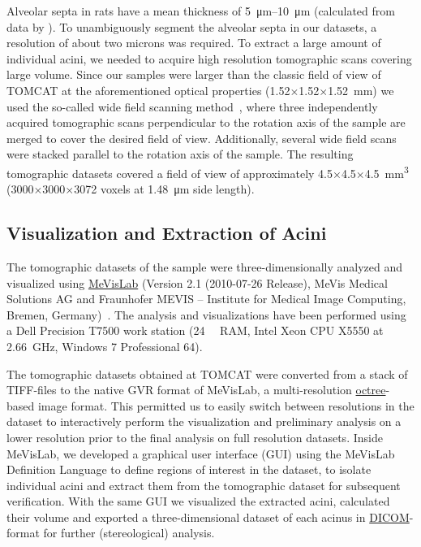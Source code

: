 \documentclass[a4paper,DIV=calc,abstract,english]{scrartcl}
\begin{document}
Alveolar septa in rats have a mean thickness of \SIrange{5}{10}{\micro\meter} (calculated from data by \citet{Burri1974}).
To unambiguously segment the alveolar septa in our datasets, a resolution of about two microns was required.
To extract a large amount of individual acini, we needed to acquire high resolution tomographic scans covering large volume.
Since our samples were larger than the classic field of view of TOMCAT at the aforementioned optical properties (1.52\(\times\)1.52\(\times\)\SI{1.52}{\milli\meter}) we used the so-called wide field scanning method~\citep{Haberthuer2010a}, where three independently acquired tomographic scans perpendicular to the rotation axis of the sample are merged to cover the desired field of view.
Additionally, several wide field scans were stacked parallel to the rotation axis of the sample.
The resulting tomographic datasets covered a field of view of approximately 4.5\(\times\)4.5\(\times\)\SI{4.5}{\milli\meter\cubed} (3000\(\times\)3000\(\times\)3072 voxels at \SI{1.48}{\micro\meter} side length).

\subsection{Visualization and Extraction of Acini}
The tomographic datasets of the sample were three-dimensionally analyzed and visualized using \href{http://mevislab.de}{MeVisLab} (Version 2.1 (2010-07-26 Release), MeVis Medical Solutions AG and Fraunhofer MEVIS -- Institute for Medical Image Computing, Bremen, Germany)~\citep{Bitter2007}.
The analysis and visualizations have been performed using a Dell Precision T7500 work station (\SI{24}{\giga\byte} RAM, Intel Xeon CPU X5550 at \SI{2.66}{\giga\hertz}, Windows 7 Professional \SI{64}{\bit}).

The tomographic datasets obtained at TOMCAT were converted from a stack of TIFF-files to the native GVR format of MeVisLab, a multi-resolution \href{https://secure.wikimedia.org/wikipedia/en/w/index.php?title=Octree&oldid=409131920}{octree}-based image format.
This permitted us to easily switch between resolutions in the dataset to interactively perform the visualization and preliminary analysis on a lower resolution prior to the final analysis on full resolution datasets.
Inside MeVisLab, we developed a graphical user interface (GUI) using the MeVisLab Definition Language to define regions of interest in the dataset, to isolate individual acini and extract them from the tomographic dataset for subsequent verification.
With the same GUI we visualized the extracted acini, calculated their volume and exported a three-dimensional dataset of each acinus in \href{http://en.wikipedia.org/w/index.php?title=DICOM&oldid=511155074}{DICOM}-format for further (stereological) analysis.
\end{document}
